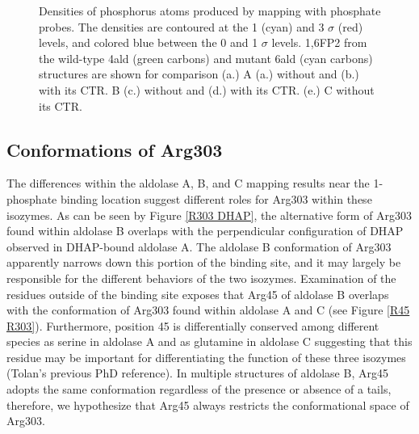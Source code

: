 \documentclass[11pt,a4paper]{article}
\begin{document}
\begin{figure}
\begin{center}
{                }
                \caption{
		Densities of phosphorus atoms produced by mapping with phosphate probes.  The densities are contoured at the 
		1 (cyan) and 3 $\sigma$ (red) levels, and colored blue between the 0 and 1 $\sigma$ levels.  1,6FP2 from 
		the wild-type 4ald (green carbons) and mutant 6ald (cyan carbons) structures are shown for comparison (a.)
		A (a.) without and (b.) with its CTR.  
		B (c.) without and (d.) with its CTR. 	(e.) C without its CTR.
                }
                \label{phosphate clusters}
        \end{center}
\end{figure}

\subsection{Conformations of Arg303}
	The differences within the aldolase A, B, and C mapping results near the 1-phosphate binding location suggest different roles
	for Arg303 within these isozymes.  As can be seen by Figure \ref{R303 DHAP}, the alternative form of Arg303 found within aldolase B overlaps with the perpendicular 
	configuration of DHAP observed in DHAP-bound aldolase A.  The aldolase B conformation of Arg303 apparently narrows down this 
	portion of the binding site, and it may largely be responsible for the different behaviors of the two isozymes.  Examination
	of the residues outside of the binding site exposes that
	Arg45 of aldolase B overlaps with the conformation of Arg303
	found within aldolase A and C (see Figure \ref{R45 R303}).  Furthermore, position 45 is differentially conserved among 
	different species as serine in aldolase A and as glutamine 
        in aldolase C suggesting that this residue may be important for differentiating the function of these three isozymes (Tolan's
	previous PhD reference).  In multiple structures of aldolase B, Arg45 adopts the same conformation regardless of the presence or
	absence of a tails, therefore, we hypothesize that Arg45 always restricts the conformational space of Arg303.  
\end{document}
